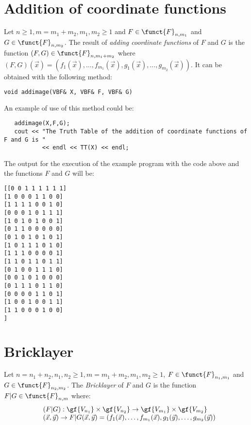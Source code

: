 \section{Addition of coordinate functions}

Let $n \geq 1, m=m_1+m_2, m_1,m_2 \geq 1$ and $F \in \funct{F}_{n,m_1}$
  and $G \in \funct{F}_{n,m_2}$. The result of \textsl{adding coordinate
    functions} of $F$ and $G$ is the function $(F,G) \in
  \funct{F}_{n,m_1+m_2}$ where $(F,G)(\vec{x}) =
  (f_1(\vec{x}),\ldots,f_{m_1}(\vec{x}),g_1(\vec{x}),\ldots,g_{m_2}(\vec{x}))$.  It can be obtained with the following method:

\begin{verbatim}
void addimage(VBF& X, VBF& F, VBF& G)  
\end{verbatim}

An example of use of this method could be:

\begin{verbatim}
   addimage(X,F,G);
   cout << "The Truth Table of the addition of coordinate functions of F and G is "
           << endl << TT(X) << endl;
\end{verbatim}

The output for the execution of the example program with the code above and the functions $F$ and $G$ will be:

\begin{verbatim}
[[0 0 1 1 1 1 1 1]
[1 0 0 0 1 1 0 0]
[1 1 1 1 0 0 1 0]
[0 0 0 1 0 1 1 1]
[1 0 1 0 1 0 0 1]
[0 1 1 0 0 0 0 0]
[0 1 0 1 0 1 0 1]
[1 0 1 1 1 0 1 0]
[1 1 1 0 0 0 0 1]
[1 1 0 1 1 0 1 1]
[0 1 0 0 1 1 1 0]
[0 0 1 0 1 0 0 0]
[0 1 1 1 0 1 1 0]
[0 0 0 0 1 1 0 1]
[1 0 0 1 0 0 1 1]
[1 1 0 0 0 1 0 0]
]
\end{verbatim}

\section{Bricklayer}

Let $n=n_1+n_2, n_1,n_2 \geq 1, m=m_1+m_2, m_1,m_2 \geq 1$, $F \in
  \funct{F}_{n_1,m_1}$ and $G \in \funct{F}_{n_2,m_2}$. The
  \textsl{Bricklayer} of $F$ and $G$ is the function $F | G \in
  \funct{F}_{n,m}$ where:
\begin{equation}
\begin{array}{ll}
   &(F | G):\gf{V_{n_1}} \times \gf{V_{n_2}} \to \gf{V_{m_1}} \times \gf{V_{m_2}} \\
	&(\vec{x},\vec{y}) \to F | G(\vec{x},\vec{y}) =
  (f_1(\vec{x}),\ldots,f_{m_1}(\vec{x}),g_1(\vec{y}),\ldots,g_{m_2}(\vec{y})) 
\end{array}
\end{equation}

